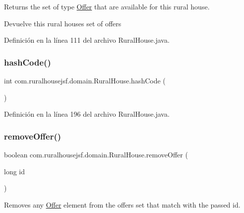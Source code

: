 Returns the set of type \mbox{\hyperlink{classcom_1_1ruralhousejsf_1_1domain_1_1_offer}{Offer}} that are available for this rural house.

\begin{DoxyReturn}{Devuelve}
this rural houses set of offers 
\end{DoxyReturn}


Definición en la línea 111 del archivo Rural\+House.\+java.

\mbox{\label{classcom_1_1ruralhousejsf_1_1domain_1_1_rural_house_a12fcb2ec3f802b71b5a1357622255b86}} 
\subsubsection{\texorpdfstring{hashCode()}{hashCode()}}
{\footnotesize\ttfamily int com.\+ruralhousejsf.\+domain.\+Rural\+House.\+hash\+Code (\begin{DoxyParamCaption}{ }\end{DoxyParamCaption})}



Definición en la línea 196 del archivo Rural\+House.\+java.

\mbox{\label{classcom_1_1ruralhousejsf_1_1domain_1_1_rural_house_ab6443a7d5fdef35c6a04110d497ddb16}} 
\subsubsection{\texorpdfstring{removeOffer()}{removeOffer()}\hspace{0.1cm}{\footnotesize\ttfamily [1/2]}}
{\footnotesize\ttfamily boolean com.\+ruralhousejsf.\+domain.\+Rural\+House.\+remove\+Offer (\begin{DoxyParamCaption}\item[{long}]{id }\end{DoxyParamCaption})}

Removes any \mbox{\hyperlink{classcom_1_1ruralhousejsf_1_1domain_1_1_offer}{Offer}} element from the offers set that match with the passed id.


